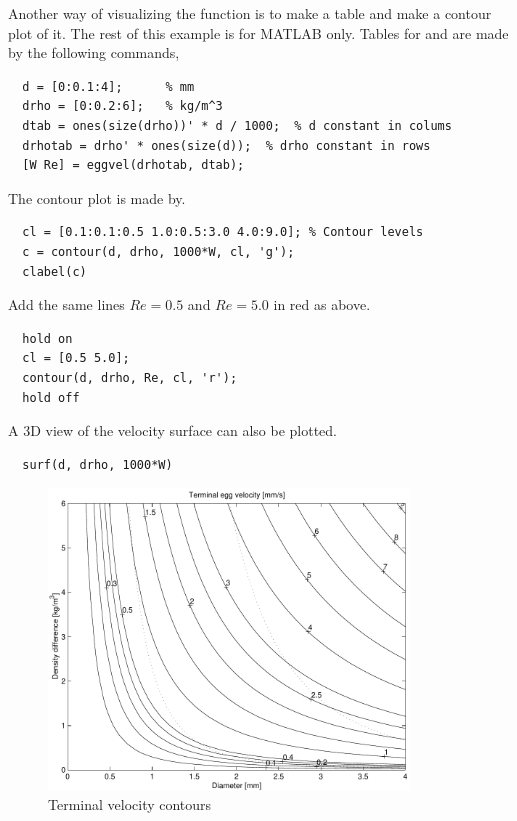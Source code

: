 Another way of visualizing the  function is to make a
table and make a contour plot of it. The rest of this example is for
MATLAB only.  Tables for  and  are made by the
following commands,
\begin{verbatim}
  d = [0:0.1:4];      % mm 
  drho = [0:0.2:6];   % kg/m^3 
  dtab = ones(size(drho))' * d / 1000;  % d constant in colums 
  drhotab = drho' * ones(size(d));  % drho constant in rows  
  [W Re] = eggvel(drhotab, dtab); 
\end{verbatim}
The contour plot is made by.
\begin{verbatim}
  cl = [0.1:0.1:0.5 1.0:0.5:3.0 4.0:9.0]; % Contour levels 
  c = contour(d, drho, 1000*W, cl, 'g'); 
  clabel(c)
\end{verbatim}
Add the same lines $Re = 0.5$ and $Re = 5.0$ in red as above.
\begin{verbatim}
  hold on 
  cl = [0.5 5.0]; 
  contour(d, drho, Re, cl, 'r'); 
  hold off
\end{verbatim}
A 3D view of the velocity surface can also be plotted.
\begin{verbatim}
  surf(d, drho, 1000*W) 
\end{verbatim}

\begin{figure}
\begin{center}
\includegraphics[height=8cm]{ex4b}
\end{center}
\caption{Terminal velocity contours}\label{fig:ex4b}
\end{figure}


